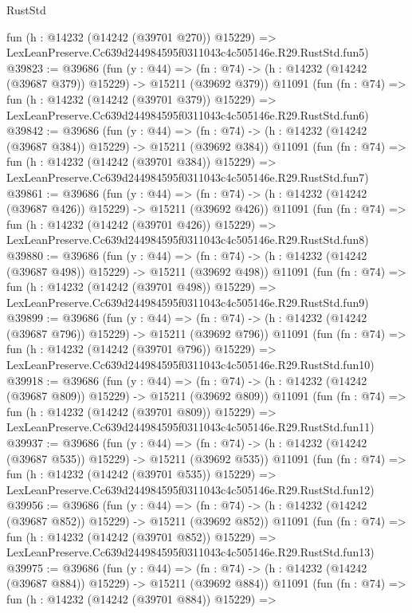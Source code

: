 \begin{lexlean}{RustStd}
\begin{coremodule}
    fun (h : @14232 (@14242 (@39701 @270)) @15229) =>
    LexLeanPreserve.Cc639d244984595f0311043c4c505146e.R29.RustStd.fun5)
@39823 := @39686
    (fun (y : @44) =>
    (fn : @74) -> (h : @14232 (@14242 (@39687 @379)) @15229) -> @15211 (@39692 @379))
    @11091
    (fun (fn : @74) =>
    fun (h : @14232 (@14242 (@39701 @379)) @15229) =>
    LexLeanPreserve.Cc639d244984595f0311043c4c505146e.R29.RustStd.fun6)
@39842 := @39686
    (fun (y : @44) =>
    (fn : @74) -> (h : @14232 (@14242 (@39687 @384)) @15229) -> @15211 (@39692 @384))
    @11091
    (fun (fn : @74) =>
    fun (h : @14232 (@14242 (@39701 @384)) @15229) =>
    LexLeanPreserve.Cc639d244984595f0311043c4c505146e.R29.RustStd.fun7)
@39861 := @39686
    (fun (y : @44) =>
    (fn : @74) -> (h : @14232 (@14242 (@39687 @426)) @15229) -> @15211 (@39692 @426))
    @11091
    (fun (fn : @74) =>
    fun (h : @14232 (@14242 (@39701 @426)) @15229) =>
    LexLeanPreserve.Cc639d244984595f0311043c4c505146e.R29.RustStd.fun8)
@39880 := @39686
    (fun (y : @44) =>
    (fn : @74) -> (h : @14232 (@14242 (@39687 @498)) @15229) -> @15211 (@39692 @498))
    @11091
    (fun (fn : @74) =>
    fun (h : @14232 (@14242 (@39701 @498)) @15229) =>
    LexLeanPreserve.Cc639d244984595f0311043c4c505146e.R29.RustStd.fun9)
@39899 := @39686
    (fun (y : @44) =>
    (fn : @74) -> (h : @14232 (@14242 (@39687 @796)) @15229) -> @15211 (@39692 @796))
    @11091
    (fun (fn : @74) =>
    fun (h : @14232 (@14242 (@39701 @796)) @15229) =>
    LexLeanPreserve.Cc639d244984595f0311043c4c505146e.R29.RustStd.fun10)
@39918 := @39686
    (fun (y : @44) =>
    (fn : @74) -> (h : @14232 (@14242 (@39687 @809)) @15229) -> @15211 (@39692 @809))
    @11091
    (fun (fn : @74) =>
    fun (h : @14232 (@14242 (@39701 @809)) @15229) =>
    LexLeanPreserve.Cc639d244984595f0311043c4c505146e.R29.RustStd.fun11)
@39937 := @39686
    (fun (y : @44) =>
    (fn : @74) -> (h : @14232 (@14242 (@39687 @535)) @15229) -> @15211 (@39692 @535))
    @11091
    (fun (fn : @74) =>
    fun (h : @14232 (@14242 (@39701 @535)) @15229) =>
    LexLeanPreserve.Cc639d244984595f0311043c4c505146e.R29.RustStd.fun12)
@39956 := @39686
    (fun (y : @44) =>
    (fn : @74) -> (h : @14232 (@14242 (@39687 @852)) @15229) -> @15211 (@39692 @852))
    @11091
    (fun (fn : @74) =>
    fun (h : @14232 (@14242 (@39701 @852)) @15229) =>
    LexLeanPreserve.Cc639d244984595f0311043c4c505146e.R29.RustStd.fun13)
@39975 := @39686
    (fun (y : @44) =>
    (fn : @74) -> (h : @14232 (@14242 (@39687 @884)) @15229) -> @15211 (@39692 @884))
    @11091
    (fun (fn : @74) =>
    fun (h : @14232 (@14242 (@39701 @884)) @15229) =>

\end{coremodule}
\end{lexlean}
